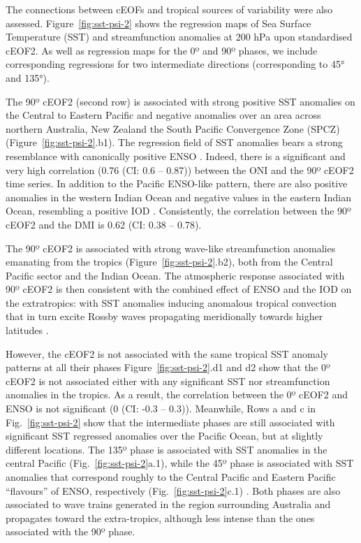 \documentclass[pdflatex,lineno,sn-basic]{sn-jnl}
\theoremstyle{thmstyleone}%
\theoremstyle{thmstyletwo}%
\theoremstyle{thmstylethree}%
\begin{document}
The connections between cEOFs and tropical sources of variability were also assessed.
Figure~\ref{fig:sst-psi-2} shows the regression maps of Sea Surface Temperature (SST) and streamfunction anomalies at 200 hPa upon standardised cEOF2.
As well as regression maps for the 0º and 90º phases, we include corresponding regressions for two intermediate directions (corresponding to 45° and 135°).

The 90º cEOF2 (second row) is associated with strong positive SST anomalies on the Central to Eastern Pacific and negative anomalies over an area across northern Australia, New Zealand the South Pacific Convergence Zone (SPCZ) (Figure~\ref{fig:sst-psi-2}.b1).
The regression field of SST anomalies bears a strong resemblance with canonically positive ENSO \citep{bamston1997}.
Indeed, there is a significant and very high correlation (0.76 (CI: 0.6 -- 0.87)) between the ONI and the 90º cEOF2 time series.
In addition to the Pacific ENSO-like pattern, there are also positive anomalies in the western Indian Ocean and negative values in the eastern Indian Ocean, resembling a positive IOD \citep{saji1999}.
Consistently, the correlation between the 90º cEOF2 and the DMI is 0.62 (CI: 0.38 -- 0.78).

The 90º cEOF2 is associated with strong wave-like streamfunction anomalies emanating from the tropics (Figure~\ref{fig:sst-psi-2}.b2), both from the Central Pacific sector and the Indian Ocean.
The atmospheric response associated with 90º cEOF2 is then consistent with the combined effect of ENSO and the IOD on the extratropics: with SST anomalies inducing anomalous tropical convection that in turn excite Rossby waves propagating meridionally towards higher latitudes \citep{mo2000, cai2011, nuncio2015}.

However, the cEOF2 is not associated with the same tropical SST anomaly patterns at all their phases
Figure~\ref{fig:sst-psi-2}.d1 and d2 show that the 0º cEOF2 is not associated either with any significant SST nor streamfunction anomalies in the tropics.
As a result, the correlation between the 0º cEOF2 and ENSO is not significant (0 (CI: -0.3 -- 0.3)).
Meanwhile, Rows a and c in Fig.~\ref{fig:sst-psi-2} show that the intermediate phases are still associated with significant SST regressed anomalies over the Pacific Ocean, but at slightly different locations.
The 135º phase is associated with SST anomalies in the central Pacific (Fig.~\ref{fig:sst-psi-2}a.1), while the 45º phase is associated with SST anomalies that correspond roughly to the Central Pacific and Eastern Pacific ``flavours'' of ENSO, respectively (Fig.~\ref{fig:sst-psi-2}c.1) \citep{kao2009}.
Both phases are also associated to wave trains generated in the region surrounding Australia and propagates toward the extra-tropics, although less intense than the ones associated with the 90º phase.
\end{document}
